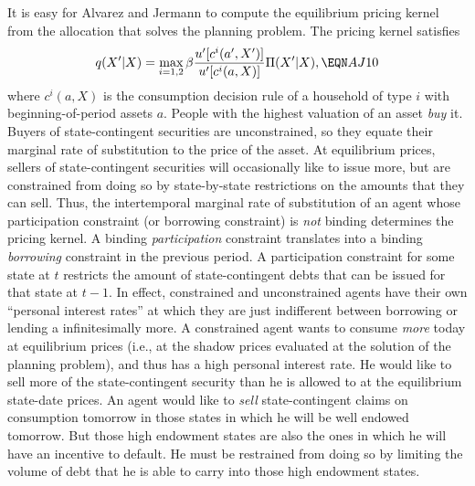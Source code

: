   It is easy for Alvarez and Jermann to compute the equilibrium
pricing kernel from the allocation that solves the planning
problem.  The pricing kernel satisfies
$$ q(X' | X) = \max_{i=1,2} \beta {u'[c^i(a',X')] \over
                             u'[c^i(a,X)] } \Pi(X'|X) , \EQN AJ10 $$
where $c^i(a,X)$ is the consumption decision rule of a household
of type $i$ with beginning-of-period assets $a$.
  People with the highest valuation of an asset {\it buy\/} it.  Buyers
of state-contingent securities are unconstrained, so they equate
their marginal rate of substitution to the price of the asset. At
equilibrium prices, sellers of state-contingent securities will occasionally like
to issue more, but are constrained from doing so by state-by-state
restrictions on the amounts that they can sell.  Thus, the intertemporal
marginal rate of substitution of an agent whose participation constraint
(or borrowing constraint) is {\it not\/} binding determines the
pricing kernel. %
A binding {\it participation\/} constraint translates
  into a binding {\it borrowing\/} constraint in the previous period.  A participation constraint for some state
  at $t$ restricts the amount of state-contingent debts that can be issued for that state at $t-1$.
   In effect, constrained and unconstrained agents have
their own ``personal interest rates'' at which they are just indifferent
between borrowing or lending a infinitesimally more.  A constrained
agent wants to consume {\it more\/} today at equilibrium prices
(i.e., at the shadow prices  evaluated at the solution of the
planning problem), and thus has a high personal interest rate.  He
would like to sell more of the state-contingent security than he is
allowed to at the equilibrium state-date prices.  An agent would like
to {\it sell\/} state-contingent claims on consumption tomorrow in those
states in which he will be well endowed tomorrow.  But those high
endowment states are also the ones in which he will have an incentive
to default.  He must be restrained from doing so by limiting the volume
of debt that he is able to carry into those high endowment states.
